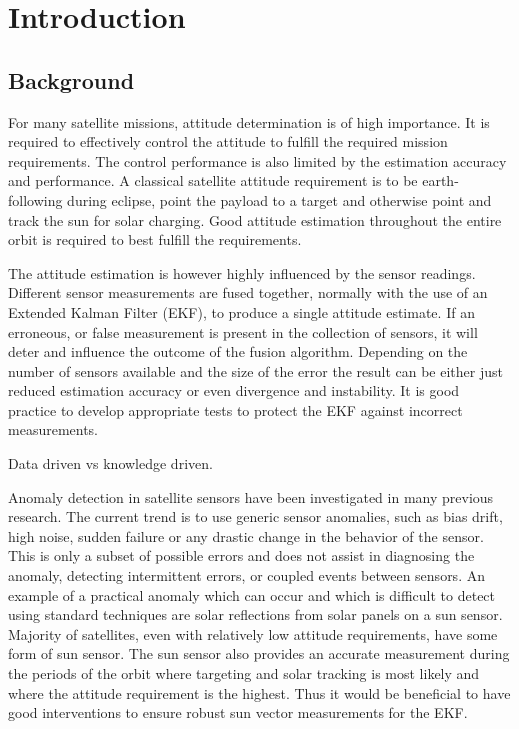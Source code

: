 %
%


\chapter{Introduction}
\label{chap:Introduction}
\section{Background}
For many satellite missions, attitude determination is of high importance. It is required to effectively control the attitude to fulfill the required mission requirements.  The control performance is also limited by the estimation accuracy and performance.  A classical satellite attitude requirement is to be earth-following during eclipse, point the payload to a target and otherwise point and track the sun for solar charging. Good attitude estimation throughout the entire orbit is required to best fulfill the requirements.

The attitude estimation is however highly influenced by the sensor readings. Different sensor measurements are fused together, normally with the use of an Extended Kalman Filter (EKF), to produce a single attitude estimate.  If an erroneous, or false measurement is present in the collection of sensors, it will deter and influence the outcome of the fusion algorithm.  Depending on the number of sensors available and the size of the error the result can be either just reduced estimation accuracy or even divergence and instability. It is good practice to develop appropriate tests to protect the EKF against incorrect measurements. 

Data driven vs knowledge driven.

Anomaly detection in satellite sensors have been investigated in many previous research.  The current trend is to use generic sensor anomalies, such as bias drift, high noise, sudden failure or any drastic change in the behavior of the sensor. This is only a subset of possible errors and does not assist in diagnosing the anomaly, detecting intermittent errors, or coupled events between sensors. An example of a practical anomaly which can occur and which is difficult to detect using standard techniques are solar reflections from solar panels on a sun sensor. Majority of satellites, even with relatively low attitude requirements, have some form of sun sensor.  The sun sensor also provides an accurate measurement during the periods of the orbit where targeting and solar tracking is most likely and where the attitude requirement is the highest.  Thus it would be beneficial to have good interventions to ensure robust sun vector measurements for the EKF.

